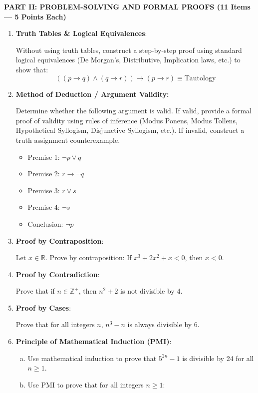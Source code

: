 \documentclass[12pt]{article}
\begin{document}
\begin{center}
\end{center}
\newpage

\noindent \textbf{PART II: PROBLEM-SOLVING AND FORMAL PROOFS (11 Items — 5 Points Each)}
\begin{enumerate}[1.]
    \item{\textbf{Truth Tables \& Logical Equivalences}:}
    
    Without using truth tables, construct a step-by-step proof using standard logical equivalences (De Morgan's, Distributive, Implication laws, etc.) to show that:
    \[((p \to q) \wedge (q \to r)) \to (p \to r) \equiv \text{Tautology}\]

    \item{\textbf{Method of Deduction / Argument Validity:}}

    Determine whether the following argument is valid. If valid, provide a formal proof of validity using rules of inference (Modus Ponens, Modus Tollens, Hypothetical Syllogism, Disjunctive Syllogism, etc.). If invalid, construct a truth assignment counterexample.
    \begin{itemize}
        \item{Premise 1: $\neg p \vee q$}
        \item{Premise 2: $r \to \neg q$}
        \item{Premise 3: $r \vee s$}
        \item{Premise 4: $\neg s$}
        \item{Conclusion: $\neg p$}
    \end{itemize}

    \item{\textbf{Proof by Contraposition}:}

    Let $x \in \mathbb{R}$. Prove by contraposition: If $x^3 + 2x^2 + x < 0$, then $x < 0$.

    \item{\textbf{Proof by Contradiction}:}

    Prove that if $n \in \mathbb{Z}^+$, then $n^2 + 2$ is not divisible by 4.

    \item{\textbf{Proof by Cases}:}

    Prove that for all integers $n$, $n^3 - n$ is always divisible by 6.

    \item{\textbf{Principle of Mathematical Induction (PMI)}:}
        \begin{enumerate}[a.]
            \item{Use mathematical induction to prove that $5^{2n} - 1$ is divisible by 24 for all $n \ge 1$.} 
            \item{Use PMI to prove that for all integers $n \ge 1$:}


\end{enumerate}
\end{enumerate}
\end{document}
